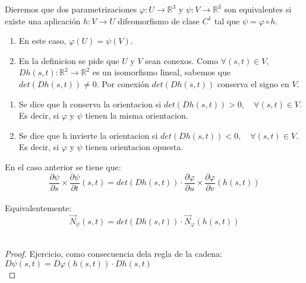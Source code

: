 \begin{definición}
    Dieremos que dos parametrizaciones $\varphi: U \to \mathbb{R}^3$ y $\psi: V \to \mathbb{R}^3$ son equivalentes si existe una aplicación $h: V \to U$ difeomorfismo de clase $C^1$ tal que $\psi = \varphi \circ h$.\\
\end{definición}

\begin{observación}
    \begin{enumerate}
        \item En este caso, $\varphi(U) = \psi(V)$.
        \item En la definicion se pide que $U$ y $V$ sean conexos. Como $\forall(s,t) \in V$, $Dh(s,t): \mathbb{R}^2 \to \mathbb{R}^2$ es un isomorfismo lineal, sabemos que $det(Dh(s,t)) \neq 0$. Por conexión $det(Dh(s,t))$ conserva el signo en $V$.
    \end{enumerate}
\end{observación}

\begin{definición}
    \begin{enumerate}
        \item Se dice que h conserva la orientacion si $det(Dh(s,t)) > 0, \quad \forall (s,t) \in V$. \\
        Es decir, si $\varphi$ y $\psi$ tienen la misma orientacion.
        \item Se dice que h invierte la orientacion si $det(Dh(s,t)) < 0, \quad \forall (s,t) \in V$. \\
        Es decir, si $\varphi$ y $\psi$ tienen orientacion opuesta.
    \end{enumerate}
\end{definición}

\begin{lema}
    En el caso anterior se tiene que:
    $$\frac{\partial \psi}{\partial s} \times \frac{\partial \psi}{\partial t} (s,t) = det(Dh(s,t)) \cdot \frac{\partial \varphi}{\partial u} \times \frac{\partial \varphi}{\partial v} (h(s,t))$$\\
    Equivalentemente:
    $$ \vec{N}_{\psi}(s,t) = det(Dh(s,t)) \cdot \vec{N}_{\varphi}(h(s,t)) $$\\  
\end{lema}

\begin{proof}
    Ejercicio, como consecuencia dela regla de la cadena: $D\psi(s,t) = D\varphi(h(s,t)) \cdot Dh(s,t)$\\
\end{proof}


